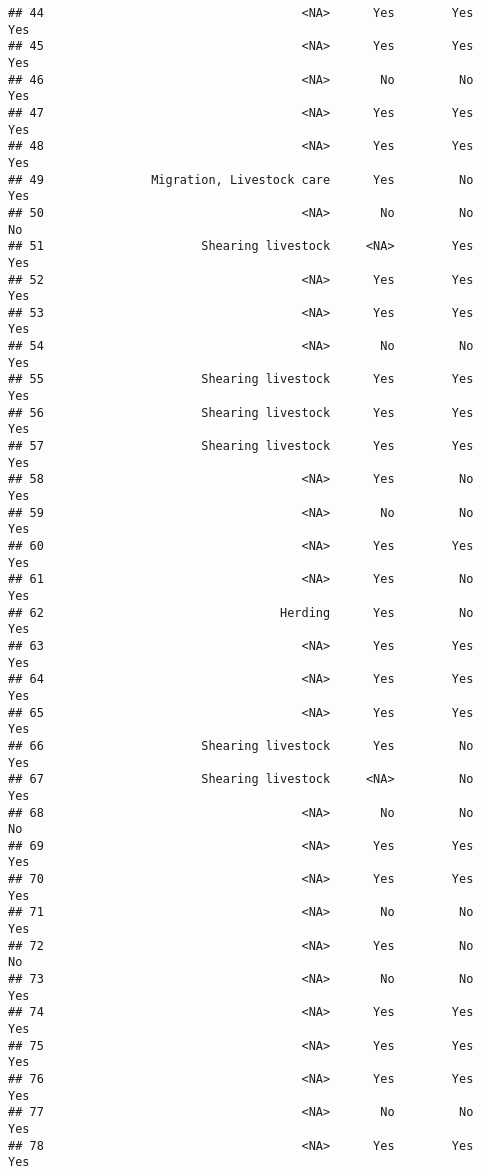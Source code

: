 \documentclass[
]{article}
\begin{document}
\begin{verbatim}
## 44                                    <NA>      Yes        Yes      Yes
## 45                                    <NA>      Yes        Yes      Yes
## 46                                    <NA>       No         No      Yes
## 47                                    <NA>      Yes        Yes      Yes
## 48                                    <NA>      Yes        Yes      Yes
## 49               Migration, Livestock care      Yes         No      Yes
## 50                                    <NA>       No         No       No
## 51                      Shearing livestock     <NA>        Yes      Yes
## 52                                    <NA>      Yes        Yes      Yes
## 53                                    <NA>      Yes        Yes      Yes
## 54                                    <NA>       No         No      Yes
## 55                      Shearing livestock      Yes        Yes      Yes
## 56                      Shearing livestock      Yes        Yes      Yes
## 57                      Shearing livestock      Yes        Yes      Yes
## 58                                    <NA>      Yes         No      Yes
## 59                                    <NA>       No         No      Yes
## 60                                    <NA>      Yes        Yes      Yes
## 61                                    <NA>      Yes         No      Yes
## 62                                 Herding      Yes         No      Yes
## 63                                    <NA>      Yes        Yes      Yes
## 64                                    <NA>      Yes        Yes      Yes
## 65                                    <NA>      Yes        Yes      Yes
## 66                      Shearing livestock      Yes         No      Yes
## 67                      Shearing livestock     <NA>         No      Yes
## 68                                    <NA>       No         No       No
## 69                                    <NA>      Yes        Yes      Yes
## 70                                    <NA>      Yes        Yes      Yes
## 71                                    <NA>       No         No      Yes
## 72                                    <NA>      Yes         No       No
## 73                                    <NA>       No         No      Yes
## 74                                    <NA>      Yes        Yes      Yes
## 75                                    <NA>      Yes        Yes      Yes
## 76                                    <NA>      Yes        Yes      Yes
## 77                                    <NA>       No         No      Yes
## 78                                    <NA>      Yes        Yes      Yes

\end{verbatim}
\end{document}
